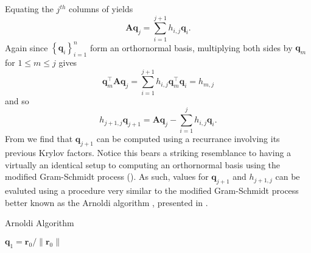Equating the $j^{th}$ columns of  yields
\[
    \bm{A} \bm{q}_j = \sum_{i=1}^{j+1} h_{i,j} \bm{q}_{i}.
\]
Again since $\left\{ \bm{q}_i \right\}_{i=1}^{n}$ form an orthornormal basis, multiplying both sides by $\bm{q}_m$ for $1 \leq m \leq j$ gives
\[
    \bm{q}_m^{\intercal} \bm{A} \bm{q}_j = \sum_{i=1}^{j+1} h_{i,j} \bm{q}_m^{\intercal} \bm{q}_{i} = h_{m,j}
\]
and so
\begin{equation}\label{eq: arn_eq_1}
    h_{j+1,j} \bm{q}_{j+1} = \bm{A} \bm{q}_j - \sum_{i=1}^{j} h_{i,j} \bm{q}_{i}.
\end{equation}
From  we find that $\bm{q}_{j+1}$ can be computed using a recurrance involving its previous Krylov factors. Notice this bears a striking resemblance to  having a virtually an identical setup to computing an orthornormal basis using the modified Gram-Schmidt process (). As such, values for $\bm{q}_{j+1}$ and $h_{j+1,j}$ can be evaluted using a procedure very similar to the modified Gram-Schmidt process better known as the Arnoldi algorithm \cite{TrefethenLloydN.LloydNicholas1997Nla/,DemmelJamesW1997Anla}, presented in .

{\centering
\begin{minipage}{.85\linewidth}
    \begin{algorithm}[H]
        \caption{Arnoldi Algorithm}
        \label{alg: Arnoldi_Algorithm}
        \SetAlgoLined
        \DontPrintSemicolon

        \BlankLine
        $\bm{q}_1 = \bm{r}_0 / \| \bm{r}_0 \|$\;
        \BlankLine
    \end{algorithm}
\end{minipage}
\par
}

